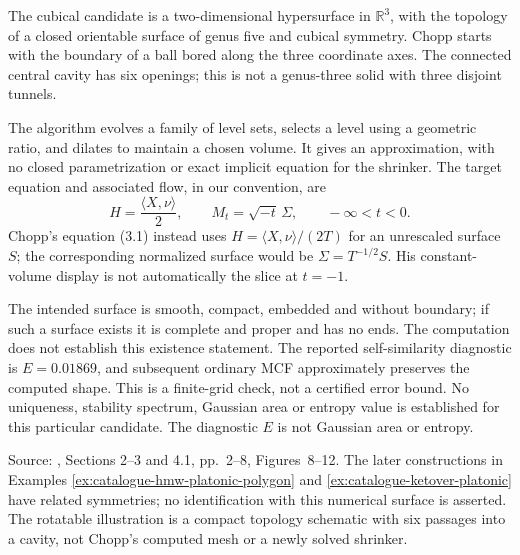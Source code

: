 \begin{example}\label{ex:catalogue-chopp-cube}
The cubical candidate is a two-dimensional hypersurface in $\mathbb R^3$,
with the topology of a closed orientable surface of genus five and cubical
symmetry. Chopp starts with the boundary of a ball bored along the three
coordinate axes. The connected central cavity has six openings; this is
not a genus-three solid with three disjoint tunnels.

The algorithm evolves a family of level sets, selects a level using a
geometric ratio, and dilates to maintain a chosen volume. It gives an
approximation, with no closed parametrization or exact implicit equation
for the shrinker. The target equation and associated flow, in our convention, are
\[
 H=\frac{\langle X,\nu\rangle}{2},\qquad
 M_t=\sqrt{-t}\,\Sigma,\qquad -\infty<t<0.
\]
Chopp's equation (3.1) instead uses $H=\langle X,\nu\rangle/(2T)$ for an
unrescaled surface $S$; the corresponding normalized surface would be
$\Sigma=T^{-1/2}S$. His constant-volume display is not automatically the
slice at $t=-1$.

The intended surface is smooth, compact, embedded and without boundary;
if such a surface exists it is complete and proper and has no ends.
The computation does not establish this existence statement. The reported
self-similarity diagnostic is $E=0.01869$, and subsequent ordinary MCF
approximately preserves the computed shape. This is a finite-grid check,
not a certified error bound. No uniqueness, stability spectrum, Gaussian
area or entropy value is established for this particular candidate.
The diagnostic $E$ is not Gaussian area or entropy.

Source: \cite{CatChopp1994}, Sections 2--3 and 4.1, pp.~2--8,
Figures~8--12. The later constructions in
Examples \ref{ex:catalogue-hmw-platonic-polygon} and
\ref{ex:catalogue-ketover-platonic} have related symmetries; no identification
with this numerical surface is asserted. The rotatable illustration is a
compact topology schematic with six passages into a cavity, not Chopp's
computed mesh or a newly solved shrinker.
\end{example}

